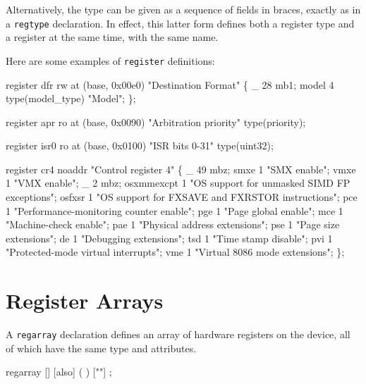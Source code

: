 \documentclass[a4paper,11pt,twoside]{report}
\begin{document}
\begin{description}
  Alternatively, the type can be given as a sequence of fields in
  braces, exactly as in a \texttt{regtype} declaration.  In effect,
  this latter form defines both a register type and a register at the
  same time, with the same name. 

\end{description}

Here are some examples of \texttt{register} definitions:

\begin{example}
  register dfr rw at (base, 0x00e0) "Destination Format" \{
    _           28 mb1;
    model       4 type(model_type) "Model";
  \};
\end{example}
\begin{example}
  register apr ro at (base, 0x0090) "Arbitration priority" type(priority);
\end{example}
\begin{example}
  register isr0 ro at (base, 0x0100) "ISR bits 0-31" type(uint32);
\end{example}
\begin{example}
  register cr4 noaddr "Control register 4" \{
    _           49 mbz;
    smxe        1 "SMX enable";
    vmxe        1 "VMX enable";
    _           2 mbz;
    osxmmexcpt  1 "OS support for unmasked SIMD FP exceptions";
    osfxsr      1 "OS support for FXSAVE and FXRSTOR instructions";
    pce         1 "Performance-monitoring counter enable";
    pge         1 "Page global enable";
    mce         1 "Machine-check enable";
    pae         1 "Physical address extensions";
    pse         1 "Page size extensions";
    de          1 "Debugging extensions";
    tsd         1 "Time stamp disable";
    pvi         1 "Protected-mode virtual interrupts";
    vme         1 "Virtual 8086 mode extensions";
  \};
\end{example}



\section{Register Arrays}\label{sec:regarrays}

A \texttt{regarray} declaration defines an array of hardware registers
on the device, all of which have the same type and attributes. 

\begin{syntax}
regarray  [] [also] 
             (  ) [""]  ;
\end{syntax}
\end{document}
